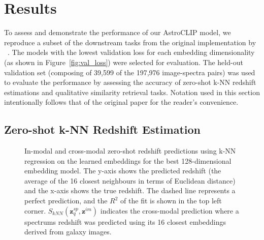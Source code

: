 
\section{Results}\label{sec:results}
To assess and demonstrate the performance of our AstroCLIP model, we reproduce a subset of the downstream tasks from
the original implementation by ~\cite{astroclip}.
The models with the lowest validation loss for each embedding dimensionality (as shown in Figure~\eqref{fig:val_loss})
were selected for evaluation.
The held-out validation set (composing of 39,599 of the 197,976 image-spectra pairs) was used to evaluate the performance
by assessing the accuracy of zero-shot k-NN redshift estimations and qualitative similarity retrieval tasks.
Notation used in this section intentionally follows that of the original paper for the reader's convenience.

\subsection{Zero-shot k-NN Redshift Estimation}\label{subsec:results-redshift-regression}

\begin{figure}[t]
    \centering
    \caption{In-modal and cross-modal zero-shot redshift predictions using k-NN regression on the learned embeddings for the
    best 128-dimensional embedding model.
    The y-axis shows the predicted redshift (the average of the 16 closest neighbours in terms of Euclidean distance) and the x-axis shows the true redshift.
    The dashed line represents a perfect prediction, and the $R^{2}$ of the fit is shown in the top left corner.
    $S_{kNN}(\mathbf{z}_{q}^{sp}, \mathbf{z}^{im})$ indicates the cross-modal prediction where a spectrums redshift was
    predicted using its 16 closest embeddings derived from galaxy images.}
    \label{fig:rkr}
\end{figure}


